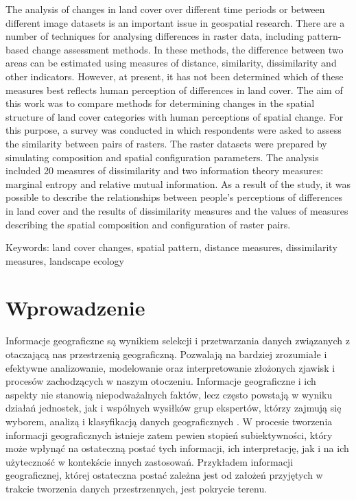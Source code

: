 \documentclass{amuthesis}
\begin{document}
The analysis of changes in land cover over different time periods or
between different image datasets is an important issue in geospatial
research. There are a number of techniques for analysing differences in
raster data, including pattern-based change assessment methods. In these
methods, the difference between two areas can be estimated using
measures of distance, similarity, dissimilarity and other indicators.
However, at present, it has not been determined which of these measures
best reflects human perception of differences in land cover. The aim of
this work was to compare methods for determining changes in the spatial
structure of land cover categories with human perceptions of spatial
change. For this purpose, a survey was conducted in which respondents
were asked to assess the similarity between pairs of rasters. The raster
datasets were prepared by simulating composition and spatial
configuration parameters. The analysis included 20 measures of
dissimilarity and two information theory measures: marginal entropy and
relative mutual information. As a result of the study, it was possible
to describe the relationships between people's perceptions of
differences in land cover and the results of dissimilarity measures and
the values of measures describing the spatial composition and
configuration of raster pairs.

Keywords: land cover changes, spatial pattern, distance measures,
dissimilarity measures, landscape ecology

\newpage

\sf\tighttoc\doublespacing


\hypertarget{sec-wprowadzenie}{%
\chapter{Wprowadzenie}\label{sec-wprowadzenie}}

Informacje geograficzne są wynikiem selekcji i przetwarzania danych
związanych z otaczającą nas przestrzenią geograficzną. Pozwalają na
bardziej zrozumiałe i efektywne analizowanie, modelowanie oraz
interpretowanie złożonych zjawisk i procesów zachodzących w naszym
otoczeniu. Informacje geograficzne i ich aspekty nie stanowią
niepodważalnych faktów, lecz często powstają w wyniku działań jednostek,
jak i wspólnych wysiłków grup ekspertów, którzy zajmują się wyborem,
analizą i klasyfikacją danych geograficznych \autocite{WhatIsLandCover}.
W procesie tworzenia informacji geograficznych istnieje zatem pewien
stopień subiektywności, który może wpłynąć na ostateczną postać tych
informacji, ich interpretację, jak i na ich użyteczność w kontekście
innych zastosowań. Przykładem informacji geograficznej, której
ostateczna postać zależna jest od założeń przyjętych w trakcie tworzenia
danych przestrzennych, jest pokrycie terenu.
\end{document}
